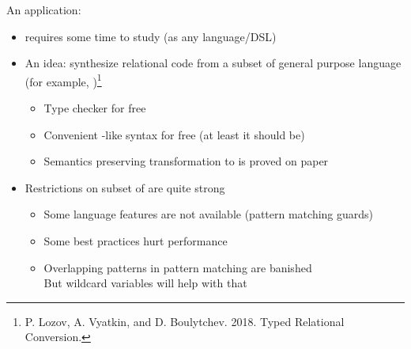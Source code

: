 \documentclass[aspectratio=169
  , xcolor={svgnames}
  , hyperref=
      { colorlinks
      , urlcolor=DarkBlue
      }
  , russian  %
  ]{beamer}
\begin{document}
\begin{frame}{An application: \noCanren}
\begin{itemize}
\item [\faBad] \miniKanren{} requires some time to study (as any language/DSL)
\item An idea: synthesize relational code from a subset of general purpose language (for example, \OCaml{})\footnote{P. Lozov, A. Vyatkin, and D. Boulytchev. 2018. Typed Relational Conversion.}
\begin{itemize}
\item[\faGood] Type checker for free
\item[\faGood] Convenient \OCaml{}-like syntax  for free (at least it should be)
\item Semantics preserving transformation to \miniKanren{} is proved on paper
\end{itemize}
\item  Restrictions on subset of \OCaml{} are quite strong
\begin{itemize}
\item Some language features are not available (pattern matching guards)
\item Some \OCaml{} best practices hurt performance
\item Overlapping patterns in pattern matching are banished\\
But wildcard variables will help with that \faGood

\end{itemize}
\end{itemize}
\end{frame}

\end{document}

